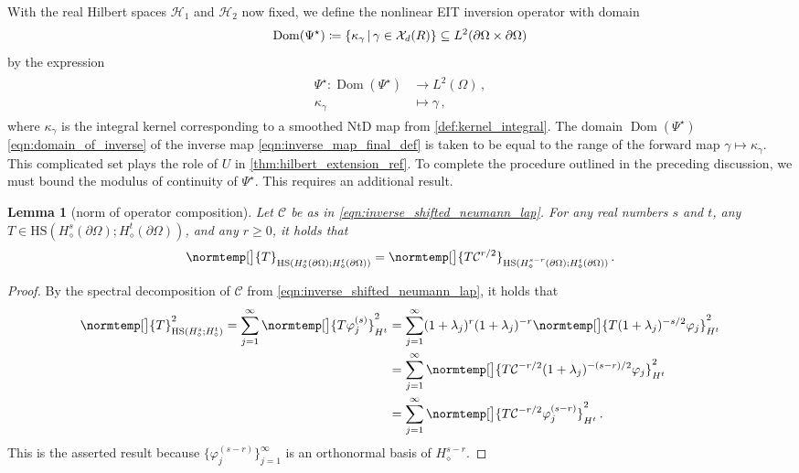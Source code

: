\documentclass[pdflatex,sn-mathphys-num]{sn-jnl-preprint}
\let\originalleft\left %
\let\originalright\right
\renewcommand{\left}{\mathopen{}\mathclose\bgroup\originalleft}
\renewcommand{\right}{\aftergroup\egroup\originalright}
\newcommand{\cH}{\mathcal{H}}
\newcommand{\cX}{\mathcal{X}}
\newcommand{\cC}{\mathcal{C}}
\newcommand{\pOmega}{{\partial\Omega}}
\newcommand{\norm}{\normtemp}
\newcommand{\set}[2]{{\left\{ #1 \,\middle|\, #2 \right\}}}
\newcommand{\defeq}{\coloneqq} %
\newcommand{\HS}{\mathrm{HS}} %
\DeclareMathOperator{\domain}{Dom} %
\theoremstyle{thmstyleone}%
\newtheorem{lemma}[theorem]{Lemma}%
\theoremstyle{thmstyletwo}%
\theoremstyle{thmstylethree}%
\numberwithin{equation}{section}
\numberwithin{theorem}{section}
\begin{document}
With the real Hilbert spaces $\cH_1$ and $\cH_2$ now fixed, we define the nonlinear EIT inversion operator with domain
\begin{align}\label{eqn:domain_of_inverse}
    \domain(\Psi^\star)\defeq \set{\kappa_\gamma}{\gamma\in\cX_d(R)} \subseteq L^2(\pOmega\times\pOmega)
\end{align}
by the expression
\begin{align}\label{eqn:inverse_map_final_def}
\begin{split}
    \Psi^\star\colon \domain(\Psi^\star)&\to L^2(\Omega)\,,\\ 
    \kappa_\gamma&\mapsto\gamma\,,
\end{split}
\end{align}
where $\kappa_\gamma$ is the integral kernel corresponding to a smoothed NtD map from \cref{def:kernel_integral}.
The domain $\domain(\Psi^\star)$ \eqref{eqn:domain_of_inverse} of the inverse map \eqref{eqn:inverse_map_final_def} is taken to be equal to the range of the forward map $\gamma\mapsto\kappa_\gamma$. This complicated set plays the role of $U$ in \cref{thm:hilbert_extension_ref}.
To complete the procedure outlined in the preceding discussion, we must bound the modulus of continuity of $\Psi^\star$. This requires an additional result.

\begin{lemma}[norm of operator composition]\label{lem:change_of_norm}
    Let $\cC$ be as in \eqref{eqn:inverse_shifted_neumann_lap}.
    For any real numbers $s$ and $t$, any $T\in\HS(H^s_\diamond(\pOmega);H^t_\diamond(\pOmega))$, and any $r\geq 0$, it holds that
    \begin{align}
        \norm[\big]{T}_{\HS(H^s_\diamond(\pOmega);H^t_\diamond(\pOmega))} = \norm[\big]{T\cC^{r/2}}_{\HS(H^{s-r}_\diamond(\pOmega);H^t_\diamond(\pOmega))}\,.
    \end{align}
\end{lemma}
\begin{proof}
    By the spectral decomposition of $\cC$ from \eqref{eqn:inverse_shifted_neumann_lap}, it holds that
    \begin{align*}
        \norm[\big]{T}^2_{\HS(H^s_\diamond;H^t_\diamond)}=\sum_{j=1}^\infty \norm[\big]{T\varphi_j^{(s)}}_{H^t}^2&=\sum_{j=1}^{\infty} (1+\lambda_j)^r(1+\lambda_j)^{-r}\norm[\big]{T(1+\lambda_j)^{-s/2}\varphi_j}_{H^t}^2\\
        &=\sum_{j=1}^{\infty} \norm[\big]{T\cC^{-r/2}(1+\lambda_j)^{-(s-r)/2}\varphi_j}_{H^t}^2\\
        &=\sum_{j=1}^{\infty}\norm[\big]{T\cC^{-r/2}\varphi_j^{(s-r)}}_{H^t}^2\,.
    \end{align*}
    This is the asserted result because $\{\varphi^{(s-r)}_j\}_{j=1}^\infty$ is an orthonormal basis of $H^{s-r}_\diamond$.
\end{proof}
\end{document}
